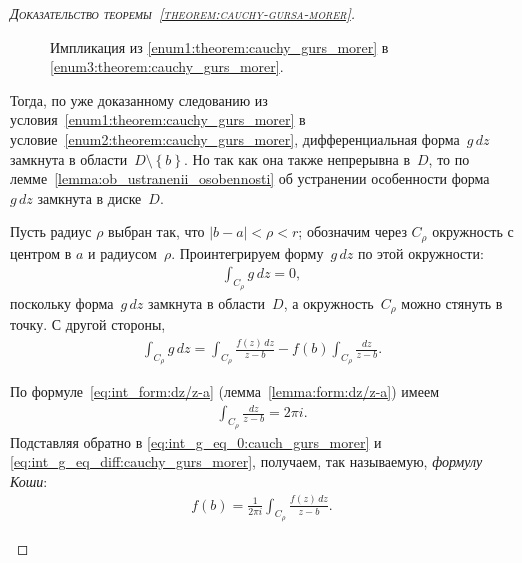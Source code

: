 \documentclass[../complex-analysis.tex]{subfiles}
\begin{document}
\begin{proof}[\normalfont\textsc{Доказательство теоремы~\ref{theorem:cauchy-gursa-morer}}]
\begin{itemize}
   \begin{figure}[ht]
    \centering
    \caption{Импликация из \ref{enum1:theorem:cauchy_gurs_morer} в \ref{enum3:theorem:cauchy_gurs_morer}.}
    \label{fig:theorem_cauchy_gurs_morer_1_to_3}
   \end{figure}

   Тогда, по уже доказанному следованию из условия~\ref{enum1:theorem:cauchy_gurs_morer} в условие~\ref{enum2:theorem:cauchy_gurs_morer}, дифференциальная форма~$ g\,dz $ замкнута в области~$ D \setminus \left\{ b \right\} $. Но так как она также непрерывна в~$ D $, то по лемме~\ref{lemma:ob_ustranenii_osobennosti} об устранении особенности форма $ g\,dz $ замкнута в диске~$ D $.

   Пусть радиус $ \rho $ выбран так, что $ \left| b-a \right| < \rho < r $; обозначим через $ C_\rho $  окружность с центром в $ a $  и радиусом~$ \rho $. Проинтегрируем форму~$ g\,dz $ по этой окружности:
   \begin{align}
    \label{eq:int_g_eq_0:cauch_gurs_morer}
    \int_{C_\rho} g\,dz = 0,
   \end{align} поскольку форма~$ g\,dz $ замкнута в области~$ D $, а окружность~$ C_\rho $ можно стянуть в точку. С другой стороны,
   \begin{align}
    \label{eq:int_g_eq_diff:cauchy_gurs_morer}
    \int_{C_\rho} g\,dz = \int_{C_\rho} \frac{f(z)\,dz}{z-b} - f(b) \int_{C_\rho} \frac{dz}{z-b}.
   \end{align}

   По формуле~\eqref{eq:int_form:dz/z-a} (лемма~\ref{lemma:form:dz/z-a}) имеем
   \begin{align*}
    \int_{C_\rho} \frac{dz}{z-b} = 2\pi i.
   \end{align*} Подставляя обратно в \eqref{eq:int_g_eq_0:cauch_gurs_morer} и \eqref{eq:int_g_eq_diff:cauchy_gurs_morer}, получаем, так называемую, \emph{формулу Коши}:
   \begin{align}
    \label{eq:cauchy_formula:cauchy_gurs_morer}
    f(b) = \frac{1}{2\pi i} \int_{C_\rho} \frac{f(z)\,dz}{z-b}.
   \end{align}


\end{itemize}
\end{proof}
\end{document}
